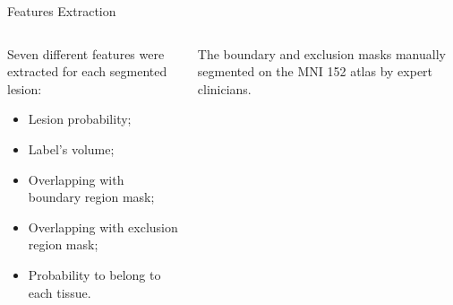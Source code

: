 \documentclass[]{standalone}
\begin{document}
	\begin{frame}{Features Extraction}{}
	
	
		\begin{columns}
			\begin{column}{0.45\textwidth}
			\small
			Seven different features were extracted for each segmented lesion:
				\begin{itemize}
				\item Lesion probability;
				\item Label's volume;
				\item Overlapping with boundary region mask;
				\item Overlapping with exclusion region mask;
				\item Probability to belong to each tissue.
				\end{itemize}
			\end{column}
			\begin{column}{0.60\textwidth}
			
			\begin{alertblock}{}
				The boundary and exclusion masks manually segmented on the MNI 152 atlas by expert clinicians.
			\end{alertblock}
			
			\hspace{-10pt}
			\begin{figure}[h!]
			\centering
			\vspace{-20pt}


\end{figure}
\end{column}
\end{columns}
\end{frame}
\end{document}
